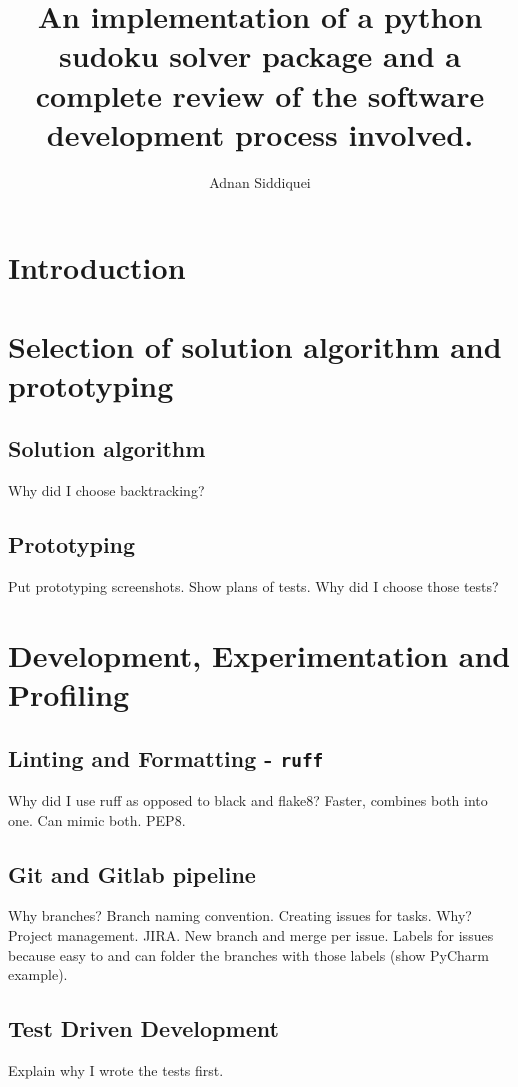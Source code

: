 \documentclass[a4paper,11pt]{article}
\title{\boldmath An implementation of a python sudoku solver package and a complete review of the software development
process involved.}
\author{Adnan Siddiquei}
\affiliation{University of Cambridge}
\newcommand{\inlinecode}[1]{\lstinline{#1}}
\begin{document}
\maketitle
\flushbottom

\section{Introduction}\label{sec:intro}

\section{Selection of solution algorithm and prototyping}\label{sec:selection-of-solution-algorithm-and-prototyping}

\subsection{Solution algorithm}\label{subsec:solution-algorithm}
Why did I choose backtracking?

\subsection{Prototyping}\label{subsec:prototyping}
Put prototyping screenshots.
Show plans of tests. Why did I choose those tests?

\section{Development, Experimentation and Profiling}\label{sec:development-experimentation-and-profiling}
\subsection{Linting and Formatting - \inlinecode{ruff}}\label{subsec:linting-and-formatting}
Why did I use ruff as opposed to black and flake8?
Faster, combines both into one. Can mimic both. PEP8.

\subsection{Git and Gitlab pipeline}\label{subsec:git-and-gitlab-pipeline}
Why branches? Branch naming convention.
Creating issues for tasks. Why? Project management. JIRA.
New branch and merge per issue.
Labels for issues because easy to and can folder the branches with those labels (show PyCharm example).

\subsection{Test Driven Development}\label{subsec:test-driven-development}
Explain why I wrote the tests first.
\end{document}
